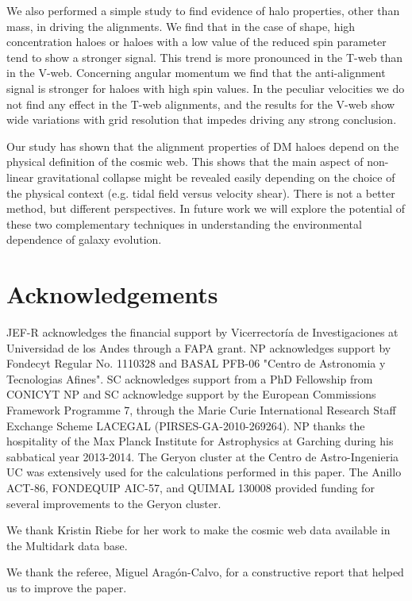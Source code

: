 \documentclass[useAMS,usenatbib]{mn2e}
\begin{document}
We also performed a simple study to find evidence of halo properties,
other than mass, in driving the alignments. We find that in the case of
shape, high concentration haloes or haloes with a low value of
the reduced spin parameter tend to show a stronger signal. This trend is
more pronounced in the T-web than in the V-web. Concerning angular
momentum we find that the anti-alignment signal is stronger for haloes
with high spin values. In the peculiar velocities we do not find any
effect in the T-web alignments, and the results for the V-web show 
wide variations with grid resolution that impedes driving any strong
conclusion.

Our study has shown that the alignment properties of DM
haloes depend on the physical definition of the cosmic web. This shows
that the main aspect of non-linear gravitational collapse might be
revealed easily depending on the choice of the physical context
(e.g. tidal field versus velocity shear). There is not a better method,
but different perspectives. In future work we will explore the
potential of these two complementary techniques in understanding the
environmental dependence of galaxy evolution.

\section*{Acknowledgements}

JEF-R acknowledges the financial support by Vicerrector\'ia de
Investigaciones at Universidad de los Andes through a FAPA grant.
NP acknowledges support by Fondecyt Regular No. 1110328 and BASAL PFB-06 "Centro de Astronomia y Tecnologias Afines".
SC acknowledges support from a PhD Fellowship from CONICYT
NP and SC acknowledge support by the European Commissions Framework
Programme 7, through the Marie Curie International Research Staff
Exchange Scheme LACEGAL (PIRSES-GA-2010-269264). NP thanks the
hospitality of the Max Planck Institute for Astrophysics at Garching
during his sabbatical year 2013-2014. The Geryon cluster at the Centro de Astro-Ingenieria UC was extensively used for the calculations performed in this paper.
The Anillo ACT-86, FONDEQUIP AIC-57, and QUIMAL 130008 provided
funding for several improvements to the Geryon cluster.


We thank Kristin Riebe for her work to make the cosmic web data
available in the Multidark data base. 

We thank the referee, Miguel Arag\'on-Calvo, for a constructive report
that helped us to improve the paper.  
\end{document}
